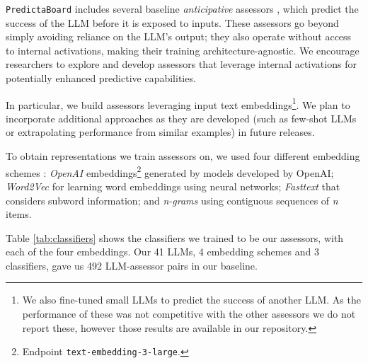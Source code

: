 \documentclass[11pt]{article}
\newcommand{\predbench}{{\tt PredictaBoard}\xspace}
\begin{document}
\predbench includes several baseline \textit{anticipative} assessors \citep{hernandez2022training}, which predict the success of the LLM before it is exposed to inputs. These assessors go beyond simply avoiding reliance on the LLM's output; they also operate without access to internal activations, making their training architecture-agnostic. We encourage researchers to explore and develop assessors that leverage internal activations for potentially enhanced predictive capabilities.

In particular, we build assessors leveraging input text embeddings\footnote{We also fine-tuned small LLMs to predict the success of another LLM. As the performance of these was not competitive with the other assessors we do not report these, however those results are available in our repository.}. We plan to 
 incorporate additional approaches as they are developed (such as few-shot LLMs or extrapolating performance from similar examples) in future releases.



To obtain representations we  train assessors on, we used four different embedding schemes \citep{kusner2015word}: \textit{OpenAI} embeddings\footnote{Endpoint \texttt{text-embedding-3-large}.} \citep{neelakantan2022text} generated by models developed by OpenAI; \textit{Word2Vec} \citep{mikolov2013efficient} for learning word embeddings using neural networks; \textit{Fasttext} \citep{bojanowski2017enriching} that considers subword information; and \textit{n-grams} \citep{sidorov2014syntactic} using contiguous sequences of \textit{n} items.

Table \ref{tab:classifiers} shows the classifiers we trained to be our assessors, with each of the four  embeddings. %
Our 41 LLMs, 4 embedding schemes and 3 classifiers, gave us 492 LLM-assessor pairs in our baseline.

\begin{table}[h]
    \centering
    \caption{Classifiers used as assessors.}
    \label{tab:classifiers}
\end{table}
\end{document}

